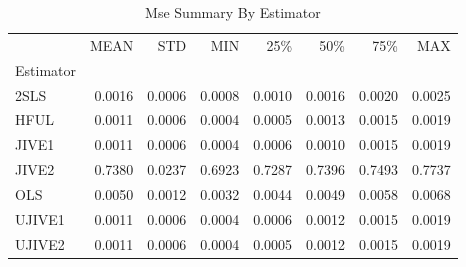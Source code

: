 \begin{table}[ht]
\centering
\caption{Mse Summary By Estimator}
\begin{tabular}{lrrrrrrr}
\toprule
 & MEAN & STD & MIN & 25\% & 50\% & 75\% & MAX \\
Estimator &  &  &  &  &  &  &  \\
\midrule
2SLS & 0.0016 & 0.0006 & 0.0008 & 0.0010 & 0.0016 & 0.0020 & 0.0025 \\
HFUL & 0.0011 & 0.0006 & 0.0004 & 0.0005 & 0.0013 & 0.0015 & 0.0019 \\
JIVE1 & 0.0011 & 0.0006 & 0.0004 & 0.0006 & 0.0010 & 0.0015 & 0.0019 \\
JIVE2 & 0.7380 & 0.0237 & 0.6923 & 0.7287 & 0.7396 & 0.7493 & 0.7737 \\
OLS & 0.0050 & 0.0012 & 0.0032 & 0.0044 & 0.0049 & 0.0058 & 0.0068 \\
UJIVE1 & 0.0011 & 0.0006 & 0.0004 & 0.0006 & 0.0012 & 0.0015 & 0.0019 \\
UJIVE2 & 0.0011 & 0.0006 & 0.0004 & 0.0005 & 0.0012 & 0.0015 & 0.0019 \\
\bottomrule
\end{tabular}
\end{table}
